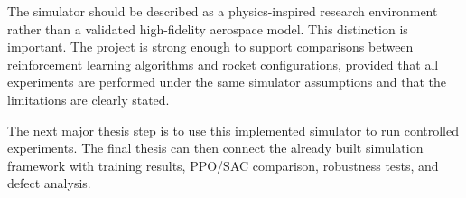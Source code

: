 \documentclass[12pt,a4paper]{article}
\begin{document}
The simulator should be described as a physics-inspired research environment rather than a validated high-fidelity aerospace model. This distinction is important. The project is strong enough to support comparisons between reinforcement learning algorithms and rocket configurations, provided that all experiments are performed under the same simulator assumptions and that the limitations are clearly stated.

The next major thesis step is to use this implemented simulator to run controlled experiments. The final thesis can then connect the already built simulation framework with training results, PPO/SAC comparison, robustness tests, and defect analysis.
\end{document}
